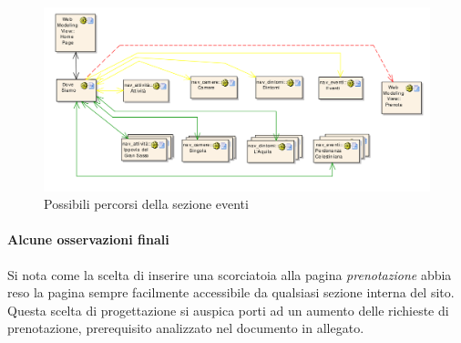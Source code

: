 \documentclass[a4paper,12pt,hidelinks]{report}
\begin{document}
\begin{figure}[h!]%
    \includegraphics[width=1.1\textwidth,keepaspectratio=true]{../../img/nav_dovesiamo}
    \centering
    \caption{Possibili percorsi della sezione eventi}%
    \label{fig:nav_dovesiamo}%
\end{figure}

\paragraph{Alcune osservazioni finali}
Si nota come la scelta di inserire una scorciatoia alla pagina \textit{prenotazione} abbia reso la pagina sempre facilmente accessibile da qualsiasi sezione 
interna del sito. Questa scelta di progettazione si auspica porti ad un aumento delle richieste di prenotazione, prerequisito analizzato nel documento in allegato.
\end{document}
